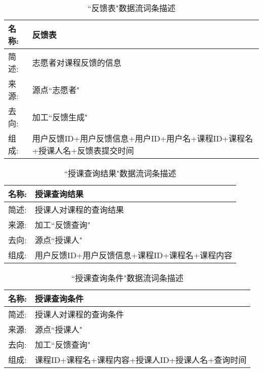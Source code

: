\begin{table}[H]  
\caption{``反馈表"数据流词条描述}  
\begin{center}  
    \begin{tabular}{l p{11cm}} 
        \hline
        \quad 名称: & 反馈表 \\
        \hline
        \quad 简述:  & 志愿者对课程反馈的信息 \\
        \hline
        \quad 来源:  & 源点``志愿者" \\
        \hline
        \quad 去向:  & 加工``反馈生成" \\
        \hline
        \quad 组成:  & 用户反馈ID+用户反馈信息+用户ID+用户名+课程ID+课程名+授课人名+反馈表提交时间 \\
        \hline
    \end{tabular}
    \label{tab1}
\end{center}
\end{table}


\begin{table}[H]  
\caption{``授课查询结果"数据流词条描述}  
\begin{center}  
    \begin{tabular}{l p{11cm}} 
        \hline
        \quad 名称: & 授课查询结果 \\
        \hline
        \quad 简述:  & 授课人对课程的查询结果 \\
        \hline
        \quad 来源:  & 加工``反馈查询" \\
        \hline
        \quad 去向:  & 源点``授课人" \\
        \hline
        \quad 组成:  & 用户反馈ID+用户反馈信息+课程ID+课程名+课程内容  \\
        \hline
    \end{tabular}
    \label{tab1}
\end{center}
\end{table}

\begin{table}[H]  
\caption{``授课查询条件"数据流词条描述}  
\begin{center}  
    \begin{tabular}{l p{11cm}} 
        \hline
        \quad 名称: & 授课查询条件 \\
        \hline
        \quad 简述: & 授课人对课程的查询条件 \\
        \hline
        \quad 来源: & 源点``授课人" \\
        \hline
        \quad 去向: & 加工``反馈查询" \\
        \hline
        \quad 组成: & 课程ID+课程名+课程内容+授课人ID+授课人名+查询时间  \\
        \hline
    \end{tabular}
    \label{tab1}
\end{center}
\end{table}

